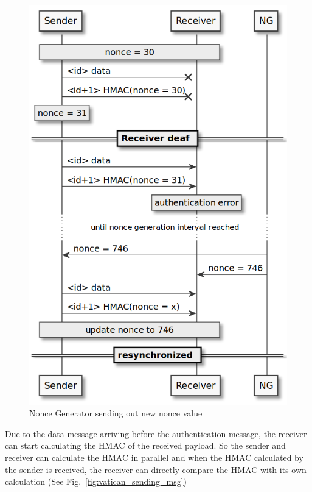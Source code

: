\begin{figure}[h]
    \centering
    \captionsetup{justification=centering}
	\includegraphics[width=0.8\linewidth]{Figures/VatiCAN_deaf_time.png}
	\caption[]{Nonce Generator sending out new nonce value}
	\label{fig:vatican_deaf_time}
\end{figure}

Due to the data message arriving before the authentication message, the receiver
can start calculating the HMAC of the received payload. So the sender and
receiver can calculate the HMAC in parallel and when the HMAC calculated by the
sender is received, the receiver can directly compare the HMAC with its own
calculation (See Fig.~\ref{fig:vatican_sending_msg})

